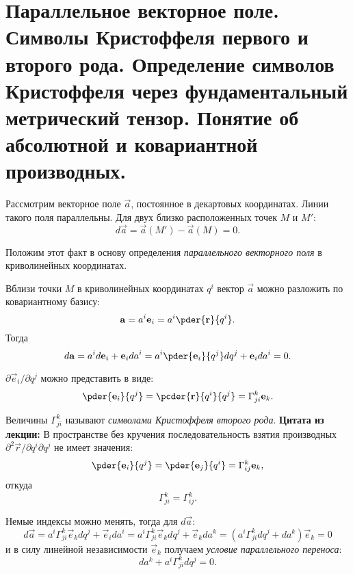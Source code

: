 \chapter{Параллельное векторное поле. Символы Кристоффеля первого и второго
рода. Определение символов Кристоффеля через фундаментальный метрический
тензор. Понятие об абсолютной и ковариантной производных.}

Рассмотрим векторное поле \( \vec{a} \), постоянное в декартовых координатах.
Линии такого поля параллельны. Для двух близко расположенных точек \( M \) и
\( M' \):
\[
    d\vec{a} = \vec{a}(M') - \vec{a}(M) = 0.
\]
    
Положим этот факт в основу определения \emph{параллельного векторного поля} в
криволинейных координатах.

Вблизи точки \( M \) в криволинейных координатах \( q^i \) вектор \( \vec{a} \)
можно разложить по ковариантному базису:
\[
    \vec{a} = a^i \vec{e}_{i} = a^i \pder{\vec{r}}{q^i}.
\]
Тогда
\[
    d\vec{a} = a^i d\vec{e}_{i} + \vec{e}_{i} da^i  = 
    a^i \pder{\vec{e}_{i}}{q^j} dq^j + \vec{e}_{i} da^i = 0.
\]
    
\( \partial\vec{e}_{i}/{\partial q^j} \) можно представить в виде:
\[
    \pder{\vec{e}_{i}}{q^j} = 
    \pcder{\vec{r}}{q^i}{q^j} =
    \Gamma^k_{ji} \vec{e}_{k}.
\]

Величины \( \Gamma^k_{ji} \) называют \emph{символами Кристоффеля второго рода}.
\textbf{Цитата из лекции:} В пространстве без кручения последовательность
взятия производных \( \partial^2{\vec{r}}/{\partial q^i \partial  q^j} \) не
имеет значения:
\[
    \pder{\vec{e}_{i}}{q^j} = 
    \pder{\vec{e}_{j}}{q^i} =
    \Gamma^k_{ij} \vec{e}_{k},
\]
откуда
\[
    \Gamma^k_{ji} = \Gamma^k_{ij}.
\]

Немые индексы можно менять, тогда для \( d\vec{a} \):
\[
    d\vec{a} = 
    a^i \Gamma^k_{ji} \vec{e}_{k} dq^j + \vec{e}_{i} da^i = 
    a^i \Gamma^k_{ji} \vec{e}_{k} dq^j + \vec{e}_{k} da^k =
    \left(a^i \Gamma^k_{ji} dq^j + da^k\right)\vec{e}_{k}  =
    0
\]
и в силу линейной независимости \( \vec{e}_{k} \) получаем \emph{условие
параллельного переноса}:
\[
    da^k + a^i \Gamma^k_{ji} dq^j  = 0.
\]
    
